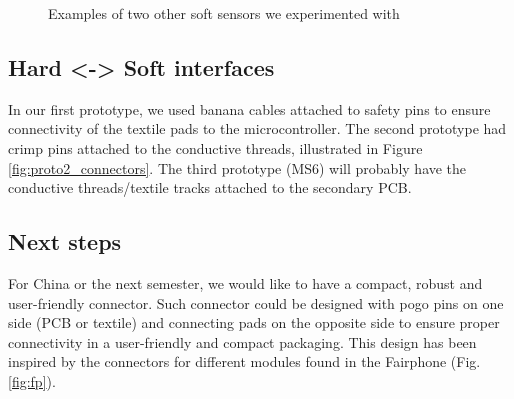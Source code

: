 \begin{figure}[H]
    \centering
    \hfill
    \hfill
    \caption{Examples of two other soft sensors we experimented with} 
    \label{fig:softsens}
\end{figure}

\subsection{Hard <-> Soft interfaces}
In our first prototype, we used banana cables attached to safety pins to ensure connectivity of the textile pads to the microcontroller. The second prototype had crimp pins attached to the conductive threads, illustrated in Figure \ref{fig:proto2_connectors}. The third prototype (MS6) will probably have the conductive threads/textile tracks attached to the secondary PCB.

\subsection{Next steps} For China or the next semester, we would like to have a compact, robust and user-friendly connector. Such connector could be designed with pogo pins on one side (PCB or textile) and connecting pads on the opposite side to ensure proper connectivity in a user-friendly and compact packaging. This design has been inspired by the connectors for different modules found in the Fairphone (Fig. \ref{fig:fp}).

